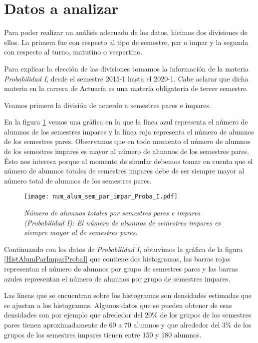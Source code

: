 \section{Datos a analizar} \label{DatosAnalizar}

Para poder realizar un análisis adecuado de los datos, hicimos dos divisiones de ellos. La primera fue con respecto al tipo de semestre, par o impar y la segunda con respecto al turno, matutino o vespertino.

Para explicar la elección de las divisiones tomamos la información de la materia \textit{Probabilidad I}, desde el semestre 2015-1 hasta el 2020-1. Cabe aclarar que dicha materia en la carrera de Actuaría es una materia obligatoria de tercer semestre.

Veamos primero la división de acuerdo a semestres pares e impares.

En la figura \ref{ParImparProbaI} vemos una gráfica en la que la línea azul representa el número de alumnos de los semestres impares y la línea roja representa el número de alumnos de los semestres pares. Observamos que en todo momento el número de alumnos de los semestres impares es mayor al número de alumnos de los semestres pares. Ésto nos interesa porque al momento de simular debemos tomar en cuenta que el número de alumnos totales de semestres impares debe de ser siempre mayor al número total de alumnos de los semestres pares.

\begin{figure}[H]
\centering
\texttt{[image: num\_alum\_sem\_par\_impar\_Proba\_I.pdf]} %
\caption[\textit{Número de alumnos totales por semestres pares e impares: Probabilidad I}]{\textit{Número de alumnos totales por semestres pares e impares (Probabilidad I): El número de alumnos de semestres impares es siempre mayor al de semestres pares.}}\label{ParImparProbaI}
\end{figure}

Continuando con los datos de \textit{Probabilidad I}, obtuvimos la gráfica de la figura \ref{HistAlumParImparProbaI} que contiene dos histogramas, las barras rojas representan el número de alumnos por grupo de semestres pares y las barras azules representan el número de alumnos por grupo de semestres impares.

Las líneas que se encuentran sobre los histogramas son densidades estimadas que se ajustan a los histogramas. Algunos datos que se pueden obtener de esas densidades son por ejemplo que alrededor del $20\%$ de los grupos de los semestres pares tienen aproximadamente de $60$ a $70$ alumnos y que alrededor del $3\%$ de los grupos de los semestres impares tienen entre 150 y 180 alumnos.

